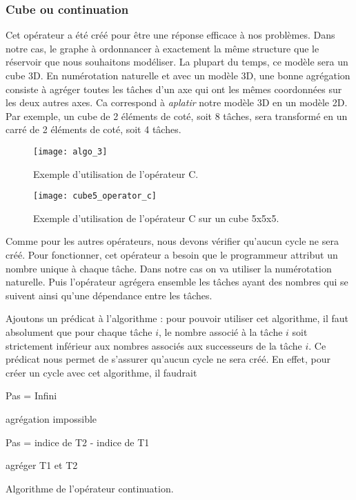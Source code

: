 \subsubsection{Cube ou continuation}
Cet opérateur a été créé pour être une réponse efficace à nos problèmes.
%
Dans notre cas, le graphe à ordonnancer à exactement la même structure que le réservoir que nous souhaitons modéliser.
%
La plupart du temps, ce modèle sera un cube 3D.
%
En numérotation naturelle et avec un modèle 3D, une bonne agrégation consiste à agréger toutes les tâches d'un axe qui ont les mêmes coordonnées sur les deux autres axes.
%
Ca correspond à {\em aplatir} notre modèle 3D en un modèle 2D.
%
Par exemple, un cube de 2 éléments de coté, soit 8 tâches, sera transformé en un carré de 2 éléments de coté, soit 4 tâches.

\begin{figure}[t!]
  \centering
  \texttt{[image: algo\_3]}
  \caption{Exemple d'utilisation de l'opérateur C.}
  \label{fig:algo_C}
\end{figure}


\begin{figure}[t!]
  \centering
  \texttt{[image: cube5\_operator\_c]}
  \caption{Exemple d'utilisation de l'opérateur C sur un cube 5x5x5.}
  \label{fig:cube5_algo_C}
\end{figure}



Comme pour les autres opérateurs, nous devons vérifier qu'aucun cycle ne sera créé.
%
Pour fonctionner, cet opérateur a besoin que le programmeur attribut un nombre unique à chaque tâche.
%
Dans notre cas on va utiliser la numérotation naturelle.
%
Puis l'opérateur agrégera ensemble les tâches ayant des nombres qui se suivent ainsi qu'une dépendance entre les tâches.

Ajoutons un prédicat à l'algorithme : pour pouvoir utiliser cet algorithme, il faut absolument que pour chaque tâche $i$, le nombre associé à la tâche $i$ soit strictement inférieur aux nombres associés aux successeurs de la tâche $i$.
%
Ce prédicat nous permet de s'assurer qu'aucun cycle ne sera créé.
%
En effet, pour créer un cycle avec cet algorithme, il faudrait


\begin{algorithm}
  {\sc Pas} = Infini \\
   {
     {
       {
        \Return agrégation impossible
      }

       {
        {\sc Pas} = indice de {\sc T2} - indice de {\sc T1}
      }
    }
  }

   {
     {
       {
        agréger {\sc T1} et {\sc T2}
      }
    }
  }
  \caption{Algorithme de l'opérateur continuation.}
  \label{algo:algo_C}
\end{algorithm}
